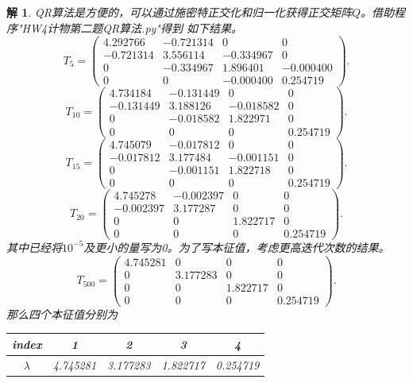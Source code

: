\documentclass[10pt]{ctexart}
\newtheorem*{solution}{解}
\begin{document}
\begin{solution}
    QR算法是方便的，可以通过施密特正交化和归一化获得正交矩阵$Q$。借助程序"HW4计物第二题QR算法.py"得到
    如下结果。
    $$T_5=
    \begin{pmatrix}
        4.292766 & -0.721314 & 0 & 0\\
        -0.721314 & 3.556114 &  -0.334967 & 0\\
        0 & -0.334967 & 1.896401 & -0.000400\\
        0 & 0 & -0.000400 & 0.254719
    \end{pmatrix}.$$
    $$T_{10}=
    \begin{pmatrix}
        4.734184 & -0.131449 & 0 & 0\\
        -0.131449 & 3.188126 & -0.018582 & 0\\
        0 & -0.018582 &  1.822971 & 0 \\
        0 & 0 & 0 & 0.254719
    \end{pmatrix}.$$
    $$T_{15}=
    \begin{pmatrix}
        4.745079 & -0.017812 & 0 & 0\\
        -0.017812 & 3.177484 & -0.001151 & 0\\
        0 & -0.001151 & 1.822718 & 0 \\
        0 & 0 & 0 & 0.254719 
    \end{pmatrix}.$$
    $$T_{20}=
    \begin{pmatrix}
        4.745278 & -0.002397 & 0 & 0\\
        -0.002397 & 3.177287 & 0 & 0\\
        0 & 0 & 1.822717 & 0 \\
        0 & 0 & 0 &0.254719
    \end{pmatrix}.$$
    其中已经将$10^{-5}$及更小的量写为0。为了写本征值，考虑更高迭代次数的结果。
    $$T_{500}=
    \begin{pmatrix}
        4.745281 & 0 & 0 & 0\\
        0 & 3.177283 & 0 & 0\\
        0 & 0 &1.822717 & 0\\
        0 & 0 & 0 & 0.254719
    \end{pmatrix}.$$
    那么四个本征值分别为
    \begin{table}[H]
        \centering
        \begin{tabular}{ccccc}
            \toprule
            index & 1 & 2 & 3 & 4 \\
            \midrule
            $\lambda$ & 4.745281 & 3.177283 & 1.822717 & 0.254719\\

\end{tabular}
\end{table}
\end{solution}
\end{document}
